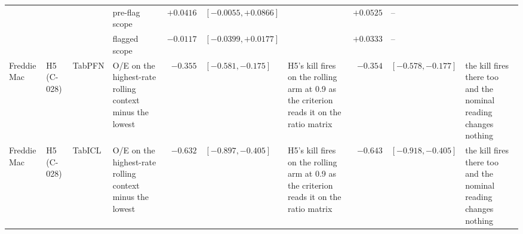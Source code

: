 \begin{tabular}{lllp{3.4cm}rlp{3.4cm}rlp{3.4cm}}
 &  &  & \quad pre-flag scope & $+0.0416$ & $[-0.0055, +0.0866]$ &  & $+0.0525$ & -- &  \\
 &  &  & \quad flagged scope & $-0.0117$ & $[-0.0399, +0.0177]$ &  & $+0.0333$ & -- &  \\
Freddie Mac & H5 (C-028) & TabPFN & O/E on the highest-rate rolling context minus the lowest & $-0.355$ & $[-0.581, -0.175]$ & H5's kill fires on the rolling arm at 0.9 as the criterion reads it on the ratio matrix & $-0.354$ & $[-0.578, -0.177]$ & the kill fires there too and the nominal reading changes nothing \\
Freddie Mac & H5 (C-028) & TabICL & O/E on the highest-rate rolling context minus the lowest & $-0.632$ & $[-0.897, -0.405]$ & H5's kill fires on the rolling arm at 0.9 as the criterion reads it on the ratio matrix & $-0.643$ & $[-0.918, -0.405]$ & the kill fires there too and the nominal reading changes nothing \\
\bottomrule
\end{tabular}
